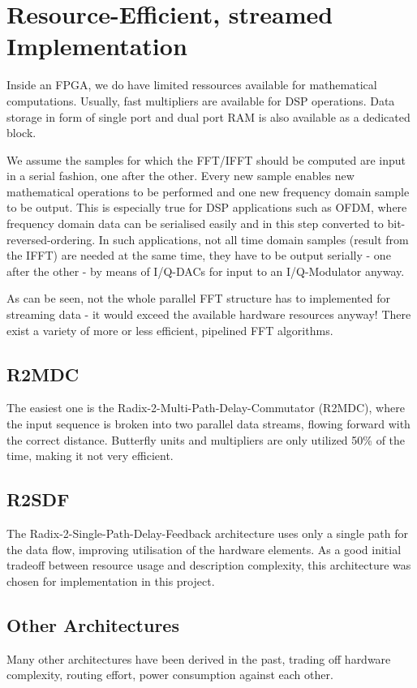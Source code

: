 \chapter{Resource-Efficient, streamed Implementation}
Inside an FPGA, we do have limited ressources available for mathematical computations. Usually, fast multipliers are available for DSP operations. Data storage in form of single port and dual port RAM is also available as a dedicated block. 

We assume the samples for which the FFT/IFFT should be computed are input in a serial fashion, one after the other. Every new sample enables new mathematical operations to be performed and one new frequency domain sample to be output. 
This is especially true for DSP applications such as OFDM, where frequency domain data can be serialised easily and in this step converted to bit-reversed-ordering. In such applications, not all time domain samples (result from the IFFT) are needed at the same time, they have to be output serially - one after the other - by means of I/Q-DACs for input to an I/Q-Modulator anyway.

As can be seen, not the whole parallel FFT structure has to implemented for streaming data - it would exceed the available hardware resources anyway! There exist a variety of more or less efficient, pipelined FFT algorithms. 

\section{R2MDC}
The easiest one is the Radix-2-Multi-Path-Delay-Commutator (R2MDC), where the input sequence is broken into two parallel data streams, flowing forward with the correct distance. Butterfly units and multipliers are only utilized 50\% of the time, making it not very efficient.

\section{R2SDF}
The Radix-2-Single-Path-Delay-Feedback architecture uses only a single path for the data flow, improving utilisation of the hardware elements. As a good initial tradeoff between resource usage and description complexity, this architecture was chosen for implementation in this project.

\section{Other Architectures}
Many other architectures have been derived in the past, trading off hardware complexity, routing effort, power consumption against each other.

